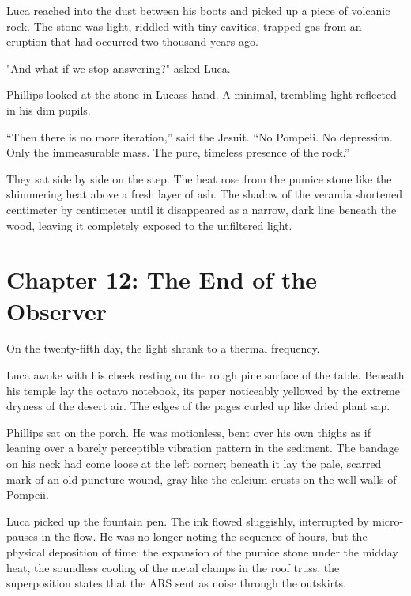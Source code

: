 \documentclass[
  ngerman,
]{article}
\begin{document}
Luca reached into the dust between his boots and picked up a piece of
volcanic rock. The stone was light, riddled with tiny cavities, trapped
gas from an eruption that had occurred two thousand years ago.

"And what if we stop answering?" asked Luca.

Phillips looked at the stone in Lucas\textquotesingle s hand. A minimal,
trembling light reflected in his dim pupils.

``Then there is no more iteration,'' said the Jesuit. ``No Pompeii. No
depression. Only the immeasurable mass. The pure, timeless presence of
the rock.''

They sat side by side on the step. The heat rose from the pumice stone
like the shimmering heat above a fresh layer of ash. The shadow of the
veranda shortened centimeter by centimeter until it disappeared as a
narrow, dark line beneath the wood, leaving it completely exposed to the
unfiltered light.

\section{}\label{section-5}

\section{\texorpdfstring{\textbf{Chapter 12: The End of the
Observer}}{Chapter 12: The End of the Observer}}\label{chapter-12-the-end-of-the-observer}

On the twenty-fifth day, the light shrank to a thermal frequency.

Luca awoke with his cheek resting on the rough pine surface of the
table. Beneath his temple lay the octavo notebook, its paper noticeably
yellowed by the extreme dryness of the desert air. The edges of the
pages curled up like dried plant sap.

Phillips sat on the porch. He was motionless, bent over his own thighs
as if leaning over a barely perceptible vibration pattern in the
sediment. The bandage on his neck had come loose at the left corner;
beneath it lay the pale, scarred mark of an old puncture wound, gray
like the calcium crusts on the well walls of Pompeii.

Luca picked up the fountain pen. The ink flowed sluggishly, interrupted
by micro-pauses in the flow. He was no longer noting the sequence of
hours, but the physical deposition of time: the expansion of the pumice
stone under the midday heat, the soundless cooling of the metal clamps
in the roof truss, the superposition states that the ARS sent as noise
through the outskirts.
\end{document}
